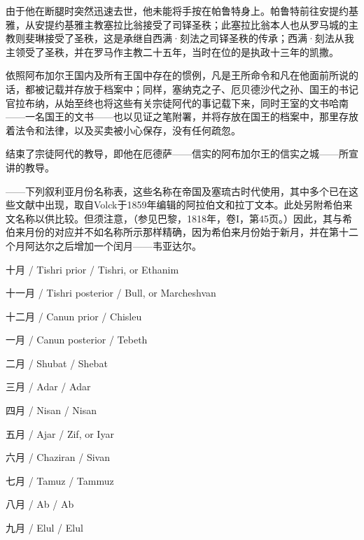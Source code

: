由于他在断腿时突然迅速去世，他未能将手按在帕鲁特身上。帕鲁特前往安提约基雅，从安提约基雅主教塞拉比翁接受了司铎圣秩；此塞拉比翁本人也从罗马城的主教则斐琳接受了圣秩，这是承继自西满·刻法之司铎圣秩的传承；西满·刻法从我主领受了圣秩，并在罗马作主教二十五年，当时在位的是执政十三年的凯撒。\par

依照阿布加尔王国内及所有王国中存在的惯例，凡是王所命令和凡在他面前所说的话，都被记载并存放于档案中；同样，塞纳克之子、厄贝德沙代之孙、国王的书记官拉布纳，从始至终也将这些有关宗徒阿代的事记载下来，同时王室的文书哈南——一名国王的文书——也以见证之笔附署，并将存放在国王的档案中，那里存放着法令和法律，以及买卖被小心保存，没有任何疏忽。\par

结束了宗徒阿代的教导，即他在厄德萨——信实的阿布加尔王的信实之城——所宣讲的教导。\par

——下列叙利亚月份名称表，这些名称在帝国及塞琉古时代使用，其中多个已在这些文献中出现，取自Volck于1859年编辑的阿拉伯文和拉丁文本。此处另附希伯来文名称以供比较。但须注意，（参见巴黎，1818年，卷I，第45页。）因此，其与希伯来月份的对应并不如名称所示那样精确，因为希伯来月份始于新月，并在第十二个月阿达尔之后增加一个闰月——韦亚达尔。\par

\par

十月 / Tishri prior / Tishri, or Ethanim\par

十一月 / Tishri posterior / Bull, or Marcheshvan\par

十二月 / Canun prior / Chisleu\par

一月 / Canun posterior / Tebeth\par

二月 / Shubat / Shebat\par

三月 / Adar / Adar\par

四月 / Nisan / Nisan\par

五月 / Ajar / Zif, or Iyar\par

六月 / Chaziran / Sivan\par

七月 / Tamuz / Tammuz\par

八月 / Ab / Ab\par

九月 / Elul / Elul\par

